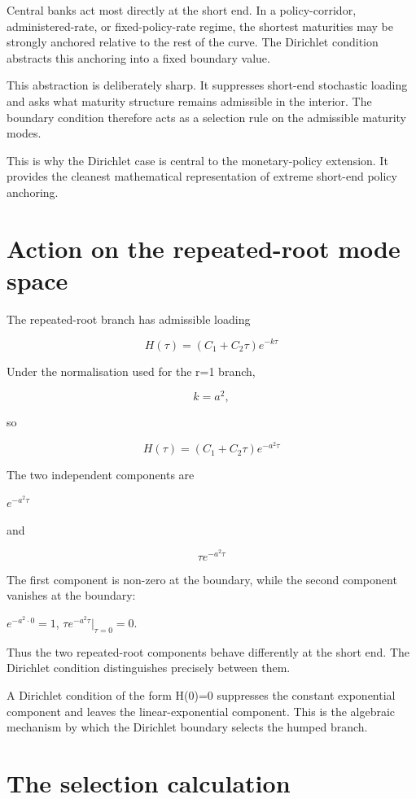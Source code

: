 \documentclass[11pt,oneside]{book}
\begin{document}
Central banks act most directly at the short end. In a policy-corridor,
administered-rate, or fixed-policy-rate regime, the shortest maturities
may be strongly anchored relative to the rest of the curve. The
Dirichlet condition abstracts this anchoring into a fixed boundary
value.

This abstraction is deliberately sharp. It suppresses short-end
stochastic loading and asks what maturity structure remains admissible
in the interior. The boundary condition therefore acts as a selection
rule on the admissible maturity modes.

This is why the Dirichlet case is central to the monetary-policy
extension. It provides the cleanest mathematical representation of
extreme short-end policy anchoring.

\section{Action on the repeated-root mode
space}\label{action-on-the-repeated-root-mode-space}

The repeated-root branch has admissible loading

\[
H(\tau)=(C_1+C_2\tau)e^{-k\tau}
\]

Under the normalisation used for the r=1 branch,

\[
k=a^2,
\]

so

\[
H(\tau)=(C_1+C_2\tau)e^{-a^2\tau}
\]

The two independent components are

$e^{-a^2\tau}$

and

\[
\tau e^{-a^2\tau}
\]

The first component is non-zero at the boundary, while the second
component vanishes at the boundary:

$e^{-a^2\cdot 0}=1$, $\tau e^{-a^2\tau}|_{\tau=0}=0$.

Thus the two repeated-root components behave differently at the short
end. The Dirichlet condition distinguishes precisely between them.

A Dirichlet condition of the form H(0)=0 suppresses the constant
exponential component and leaves the linear-exponential component. This
is the algebraic mechanism by which the Dirichlet boundary selects the
humped branch.

\section{The selection calculation}\label{the-selection-calculation}
\end{document}
